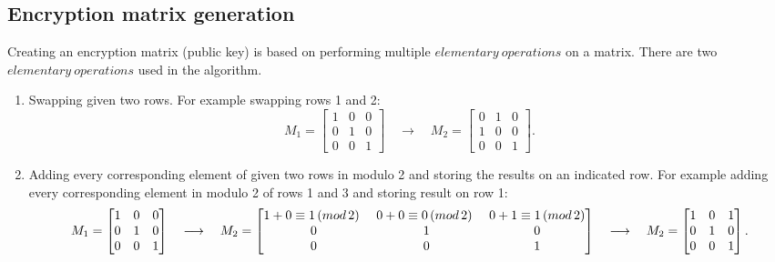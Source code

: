 \documentclass{article}
\begin{document}
    \subsection{Encryption matrix generation}
        Creating an encryption matrix (public key) is based on performing multiple $elementary\ operations$ on a matrix.
        There are two $elementary\ operations$ used in the algorithm.
        \begin{enumerate}
            \item 
                Swapping given two rows. For example swapping rows 1 and 2:
                $$M_1=\begin{bmatrix}
                1 & 0 & 0\\
                0 & 1 & 0\\
                0 & 0 & 1
                \end{bmatrix} \quad
                \longrightarrow 
                \quad M_2=\begin{bmatrix}
                0 & 1 & 0\\
                1 & 0 & 0\\
                0 & 0 & 1
                \end{bmatrix}.$$
            \item 
                Adding every corresponding element of given two rows in modulo 2 and storing the results on an indicated row. For example adding every corresponding element in modulo 2 of rows 1 and 3 and storing result on row 1:
                \footnotesize{
                $$M_1=\begin{bmatrix}
                1 & 0 & 0\\
                0 & 1 & 0\\
                0 & 0 & 1
                \end{bmatrix} \quad
                \longrightarrow 
                \quad M_2=\begin{bmatrix}
                1\color{black}+0\color{black}\equiv 1 \color{black}\,(mod\,2) \ & 0\color{black}+0\color{black}\equiv 0 \color{black}\,(mod\,2) \ & 0\color{black}+1\color{black}\equiv 1 \color{black}\,(mod\,2) \\
                0 & 1 & 0\\
                0 & 0 & 1
                \end{bmatrix}\quad
                \longrightarrow 
                \quad M_2=\begin{bmatrix}
                1 & 0 & 1\\
                0 & 1 & 0\\
                0 & 0 & 1
                \end{bmatrix}.$$
                }
        \end{enumerate}
\end{document}
